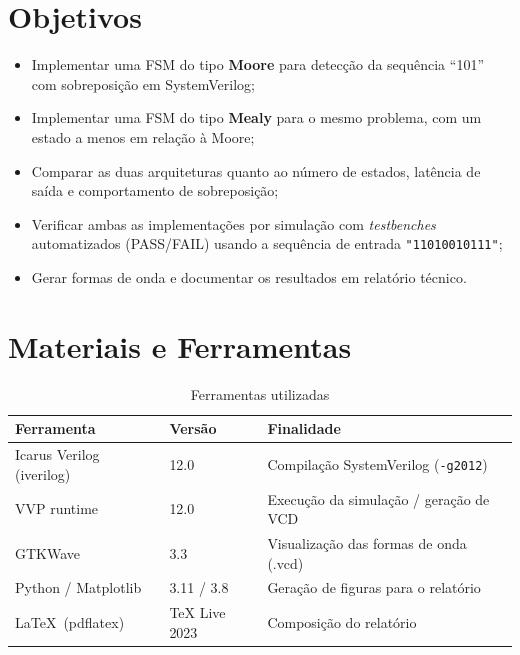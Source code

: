 \documentclass[12pt,a4paper]{article}
\begin{document}
\section{Objetivos}

\begin{itemize}[leftmargin=1.5cm]
  \item Implementar uma FSM do tipo \textbf{Moore} para detecção da sequência ``101''
        com sobreposição em SystemVerilog;
  \item Implementar uma FSM do tipo \textbf{Mealy} para o mesmo problema, com
        um estado a menos em relação à Moore;
  \item Comparar as duas arquiteturas quanto ao número de estados, latência de saída
        e comportamento de sobreposição;
  \item Verificar ambas as implementações por simulação com \textit{testbenches}
        automatizados (PASS/FAIL) usando a sequência de entrada \texttt{"11010010111"};
  \item Gerar formas de onda e documentar os resultados em relatório técnico.
\end{itemize}

\section{Materiais e Ferramentas}

\begin{table}[H]
  \centering
  \caption{Ferramentas utilizadas}
  \label{tab:ferramentas}
  \begin{tabular}{lll}
    \toprule
    \textbf{Ferramenta} & \textbf{Versão} & \textbf{Finalidade} \\
    \midrule
    Icarus Verilog (iverilog) & 12.0 & Compilação SystemVerilog (\texttt{-g2012}) \\
    VVP runtime               & 12.0 & Execução da simulação / geração de VCD \\
    GTKWave                   & 3.3  & Visualização das formas de onda (.vcd) \\
    Python / Matplotlib       & 3.11 / 3.8 & Geração de figuras para o relatório \\
    \LaTeX\ (pdflatex)        & TeX Live 2023 & Composição do relatório \\
    \bottomrule
  \end{tabular}
\end{table}
\end{document}
